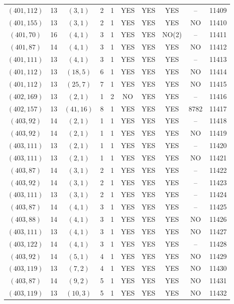 \begin{longtable}{|c|c|c|c|c|c|c|c|c|c|}
$(401, 112)$ & 13 & $(3, 1)$ & 2 & 1 & YES & YES & YES & -- & 11409\\
$(401, 155)$ & 13 & $(3, 1)$ & 2 & 1 & YES & YES & YES & NO & 11410\\
$(401, 70)$ & 16 & $(4, 1)$ & 3 & 1 & YES & YES & NO(2) & -- & 11411\\
$(401, 87)$ & 14 & $(4, 1)$ & 3 & 1 & YES & YES & YES & NO & 11412\\
$(401, 111)$ & 13 & $(4, 1)$ & 3 & 1 & YES & YES & YES & -- & 11413\\
$(401, 112)$ & 13 & $(18, 5)$ & 6 & 1 & YES & YES & YES & NO & 11414\\
$(401, 112)$ & 13 & $(25, 7)$ & 7 & 1 & YES & YES & YES & NO & 11415\\
$(402, 169)$ & 13 & $(2, 1)$ & 1 & 2 & NO & YES & YES & -- & 11416\\
$(402, 157)$ & 13 & $(41, 16)$ & 8 & 1 & YES & YES & YES & 8782 & 11417\\
$(403, 92)$ & 14 & $(2, 1)$ & 1 & 1 & YES & YES & YES & -- & 11418\\
$(403, 92)$ & 14 & $(2, 1)$ & 1 & 1 & YES & YES & YES & NO & 11419\\
$(403, 111)$ & 13 & $(2, 1)$ & 1 & 1 & YES & YES & YES & -- & 11420\\
$(403, 111)$ & 13 & $(2, 1)$ & 1 & 1 & YES & YES & YES & NO & 11421\\
$(403, 87)$ & 14 & $(3, 1)$ & 2 & 1 & YES & YES & YES & -- & 11422\\
$(403, 92)$ & 14 & $(3, 1)$ & 2 & 1 & YES & YES & YES & -- & 11423\\
$(403, 111)$ & 13 & $(3, 1)$ & 2 & 1 & YES & YES & YES & -- & 11424\\
$(403, 87)$ & 14 & $(4, 1)$ & 3 & 1 & YES & YES & YES & -- & 11425\\
$(403, 88)$ & 14 & $(4, 1)$ & 3 & 1 & YES & YES & YES & NO & 11426\\
$(403, 111)$ & 13 & $(4, 1)$ & 3 & 1 & YES & YES & YES & NO & 11427\\
$(403, 122)$ & 14 & $(4, 1)$ & 3 & 1 & YES & YES & YES & -- & 11428\\
$(403, 92)$ & 14 & $(5, 1)$ & 4 & 1 & YES & YES & YES & NO & 11429\\
$(403, 119)$ & 13 & $(7, 2)$ & 4 & 1 & YES & YES & YES & NO & 11430\\
$(403, 87)$ & 14 & $(9, 2)$ & 5 & 1 & YES & YES & YES & NO & 11431\\
$(403, 119)$ & 13 & $(10, 3)$ & 5 & 1 & YES & YES & YES & NO & 11432\\

\end{longtable}
